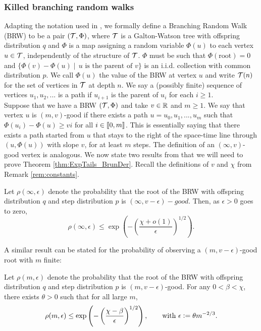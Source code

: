 \subsubsection{Killed branching random walks}
Adapting the notation used in \cite{exp_tails}, we formally define a Branching Random Walk (BRW) to be a pair $(\cal{T}, \Phi)$, where $\cal{T}$ is a Galton-Watson tree with offspring distribution $q$ and $\Phi$ is a map assigning a random variable $\Phi(u)$ to each vertex $u \in \cal{T}$, independently of the structure of $\cal{T}$. $\Phi$ must be such that  $\Phi(\text{root}) = 0$ and $\{\Phi(v) - \Phi(u) \mid\, \text{$u$ is the parent of $v$}\}$ is an i.i.d. collection with common distribution $p$. We call $\Phi(u)$ the value of the BRW at vertex $u$ and write $\cal{T}(n)$ for the set of vertices in $\cal{T}$ at depth $n$. We say a (possibly finite) sequence of vertices $u_1, u_2, ...$ is a path if $u_{i+1}$ is the parent of $u_i$ for each $i \geq 1$. \\
Suppose that we have a BRW $(\cal{T}, \Phi)$ and take $v \in \R$ and $m \geq 1$. We say that vertex $u$ is $(m, v)$-good if there exists a path $u = u_0, u_1, ..., u_m$ such that $\Phi(u_i) - \Phi(u) \geq vi$ for all $i \in \bbracket{0,m}$. This is essentially saying that there exists a path started from $u$ that stays to the right of the space-time line through $(u, \Phi(u))$ with slope $v$, for at least $m$ steps. The definition of an $(\infty, v)$-good vertex is analogous. We now state two results from \cite{gantert2008asymptotics} that we will need to prove Theorem \ref{thm:ExpTails_BrunDer}. Recall the definitions of $v$ and $\chi$ from Remark \ref{rem:constants}. 

\begin{theorem}\label{thm:infty_good}
Let $\rho(\infty, \epsilon)$ denote the probability that the root of the BRW with offspring distribution $q$ and step distribution $p$ is $(\infty, v - \epsilon)-good$. Then, as $\epsilon > 0$ goes to zero, 
\begin{equation}
\rho(\infty, \epsilon) \leq \exp\left( - \left( \frac{\chi + o(1)}{\epsilon} \right)^{1/2} \right). 
\end{equation}
\end{theorem}

A similar result can be stated for the probability of observing a $(m, v - \epsilon)$-good root with $m$ finite:
\begin{theorem}\label{thm:finite_good}
Let $\rho(m, \epsilon)$ denote the probability that the root of the BRW with offspring distribution $q$ and step distribution $p$ is $(m, v - \epsilon)$-good. For any $0 < \beta < \chi$, there exists $\theta > 0$ such that for all large $m$, 
\begin{equation*}
\rho(m, \epsilon) \leq \exp\left( - \left( \frac{\chi - \beta}{\epsilon} \right)^{1/2} \right), \qquad \text{with } \epsilon \defeq \theta m^{-2/3}. 
\end{equation*}
\end{theorem}

